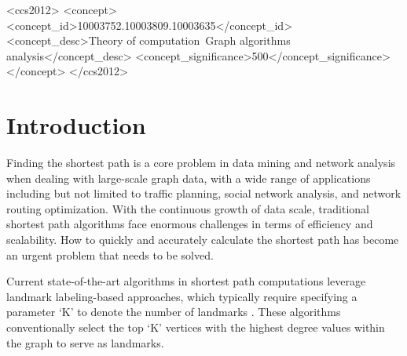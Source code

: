 \documentclass[sigconf]{acmart}
\begin{document}
\begin{CCSXML}
<ccs2012>
   <concept>
       <concept_id>10003752.10003809.10003635</concept_id>
       <concept_desc>Theory of computation~Graph algorithms analysis</concept_desc>
       <concept_significance>500</concept_significance>
       </concept>
 </ccs2012>
\end{CCSXML}




\maketitle

\section{Introduction}
Finding the shortest path is a core problem in data mining and network analysis when dealing with large-scale graph data, with a wide range of applications including but not limited to traffic planning, social network analysis, and network routing optimization\cite{ref11}. With the continuous growth of data scale, traditional shortest path algorithms face enormous challenges in terms of efficiency and scalability. How to quickly and accurately calculate the shortest path has become an urgent problem that needs to be solved.\par
Current state-of-the-art algorithms in shortest path computations leverage landmark labeling-based approaches, which typically require specifying a parameter `K' to denote the number of landmarks \cite{ref6, ref7}. These algorithms conventionally select the top `K' vertices with the highest degree values within the graph to serve as landmarks.\par
%
\end{document}
